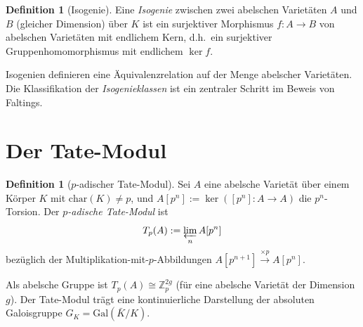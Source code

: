 ﻿\documentclass[12pt,a4paper]{article}
\theoremstyle{plain}
\theoremstyle{definition}
\newtheorem{definition}[theorem]{Definition}
\theoremstyle{remark}
\newcommand{\Z}{\mathbb{Z}}
\newcommand{\Gal}{\mathrm{Gal}}
\begin{document}
\begin{definition}[Isogenie]\label{def:isogenie}
Eine \emph{Isogenie} zwischen zwei abelschen Varietäten $A$ und $B$ (gleicher Dimension)
über $K$ ist ein surjektiver Morphismus $f: A \to B$ von abelschen Varietäten
mit endlichem Kern, d.h.\ ein surjektiver Gruppenhomomorphismus mit endlichem $\ker f$.
\end{definition}

Isogenien definieren eine Äquivalenzrelation auf der Menge abelscher Varietäten.
Die Klassifikation der \emph{Isogenieklassen} ist ein zentraler Schritt im Beweis von Faltings.

\section{Der Tate-Modul}

\begin{definition}[$p$-adischer Tate-Modul]\label{def:tate}
Sei $A$ eine abelsche Varietät über einem Körper $K$ mit $\mathrm{char}(K) \neq p$, und
$A[p^n] := \ker([p^n]: A \to A)$ die $p^n$-Torsion. Der \emph{$p$-adische Tate-Modul} ist
\[
  T_p(A) := \varprojlim_{n} A[p^n]
\]
bezüglich der Multiplikation-mit-$p$-Abbildungen $A[p^{n+1}] \xrightarrow{\times p} A[p^n]$.
\end{definition}

Als abelsche Gruppe ist $T_p(A) \cong \Z_p^{2g}$ (für eine abelsche Varietät der Dimension $g$).
Der Tate-Modul trägt eine kontinuierliche Darstellung der absoluten Galoisgruppe
$G_K = \Gal(\bar K / K)$.
\end{document}

